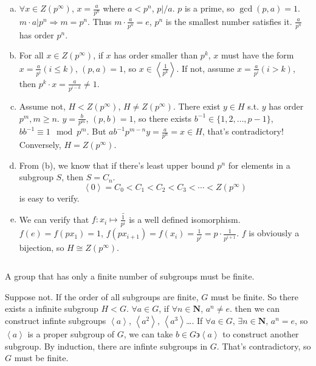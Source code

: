 \begin{answer}
    \begin{enumerate}[(a)]
        \item $\forall  x\in Z(p^{\infty})$, $x=\frac{a}{p^{n}}$ where $a<p^{n}$, $p|\!\!/a$. $p$ is a prime, so $\gcd(p,a)=1$. $m\cdot a|p^{n}\Rightarrow m=p^{n}$. Thus $m\cdot \frac{a}{p^{n}}=e$, $p^{n}$ is the smallest number satisfies it. $\frac{a}{p^{n}}$ has order $p^{n}$.
        \item For all $x\in Z(p^{\infty})$, if $x$ has order smaller than $p^{k}$, $x$ must have the form $x=\frac{a}{p^{i}}(i\leq k)$, $(p,a)=1$, so $x\in\left\langle\frac{1}{p^{k}}\right\rangle$. If not, assume $x=\frac{a}{p^{i}}(i>k)$, then $p^{k}\cdot x=\frac{a}{p^{i-k}}\neq 1$.
        \item Assume not, $H< Z(p^{\infty})$, $H\neq Z(p^{\infty})$. There exist $y\in H$ s.t. $y$ has order $p^{m}, m\geq n$. $y=\frac{b}{p^{m}}$, $(p,b)=1$, so there exists $b^{-1}\in\{1,2,\dots,p-1\}$, $bb^{-1}\equiv 1\mod p^{m}$. But $ab^{-1}p^{m-n}y=\frac{a}{p^{n}}=x\in H$, that's contradictory! Conversely, $H=Z(p^{\infty})$.
        \item From (b), we know that if there's least upper bound $p^{n}$ for elements in a subgroup $S$, then $S=C_{n}$.\[\left\langle0\right\rangle=C_{0}<C_{1}<C_{2}<C_{3}<\cdots<Z(p^{\infty})\] is easy to verify.
        \item We can verify that $f:x_{i}\mapsto \bar{\frac{1}{p^{i}}}$ is a well defined isomorphism. $f(e)=f(px_{1})=1$, $f(px_{i+1})=f(x_{i})=\frac{1}{p^{i}}=p\cdot \frac{1}{p^{i+1}}$. $f$ is obviously a bijection, so $H\cong Z(p^{\infty})$.
    \end{enumerate}
\end{answer}

$$ $$

\begin{ex}
    A group that has only a finite number of subgroups must be finite.
\end{ex}

\begin{answer}
    Suppose not. If the order of all subgroups are finite, $G$ must be finite. So there exists a infinite subgroup $H<G$. $\forall  a\in G$, if $\forall n\in \mathbf{N}$, $a^{n}\neq e$. then we can construct infinte subgroups $\left\langle a\right\rangle$, $\left\langle a^{2}\right\rangle$, $\left\langle a^{3}\right\rangle$\dots. If $\forall a\in G$, $\exists n\in \mathbf{N}$, $a^{n}=e$, so $\left\langle a\right\rangle$ is a proper subgroup of $G$, we can take $b\in G\backepsilon\left\langle a\right\rangle$ to construct another subgroup. By induction, there are infinte subgroups in $G$. That's contradictory, so $G$ must be finite.
\end{answer}

